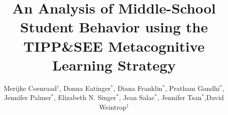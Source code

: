 \documentclass[sigconf,manuscript,review,anonymous]{acmart} %
\def\ts{TIPP\&SEE}
\begin{document}
\title[]{An Analysis of Middle-School Student Behavior using the \ts{} Metacognitive Learning Strategy}

\author{Merijke Coenraad$^\dagger$, Donna Eatinger$^\ast$, Diana Franklin$^\ast$, Pratham Gandhi$^\ast$, Jennifer Palmer$^\ast$, Elizabeth N. Singer$^\ast$, Jean Salac$^\ast$, Jennifer Tsan$^\ast$,David Weintrop$^\dagger$}

\end{document}
